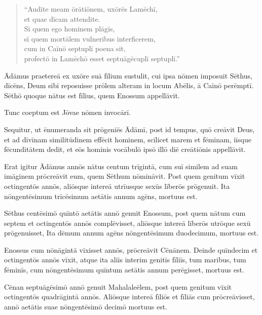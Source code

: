 \begin{verse}
\begin{patverse*}
``Audīte meam ōrātiōnem, uxōrēs Lamēchī,\\
et quae dīcam attendite.\\
Sī quem ego hominem plāgīs,\\
sī quem mortālem vulneribus interficerem,\\
\Versus cum in Caīnō septuplī poena sit,\\ profectō in Lamēchō esset septuāgēcuplī septuplī.''
\end{patverse*}
\end{verse}

\Versus Ādāmus praetereā ex uxōre suā fīlium sustulit, cui ipsa nōmen imposuit Sēthus, dīcēns, Deum sibi reposuisse prōlem alteram in locum Abēlis, ā Caīnō perēmptī.
\Versus Sēthō quoque nātus est fīlius, quem Enossum appellāvit.

Tunc coeptum est Jōvae nōmen invocārī.



\Caput
\Versus Sequitur, ut ēnumeranda sit prōgeniēs Ādāmī, post id tempus, quō creāvit Deus, et ad dīvīnam similitūdinem effēcit hominem,
\Versus scīlicet marem et fēminam, iīsque fēcunditātem dedit, et eōs hominis vocābulō ipsō illō diē creātiōnis appellāvit.

\Versus Erat igitur Ādāmus annōs nātus centum trīgintā, cum suī similem ad suam imāginem prōcreāvit eum, quem Sēthum nōmināvit.
\Versus Post quem genitum vīxit octingentōs annōs, aliōsque intereā utrīusque sexūs līberōs prōgenuit.
\Versus Ita nōngentēsimum trīcēsimum aetātis annum agēns, mortuus est.

\Versus Sēthus centēsimō quīntō aetātis annō genuit Enossum,
\Versus post quem nātum cum septem et octingentōs annōs complēvisset, aliōsque intereā līberōs utrōque sexū prōgenuisset,
\Versus Ita dēmum annum agēns nōngentēsimum duodecimum, mortuus est.

\Versus Enossus cum nōnāgintā vīxisset annōs, prōcreāvit Cēnānem.
\Versus Deinde quīndecim et octingentōs annōs vīxit, atque ita aliīs interim genitīs fīliīs, tum maribus, tum fēminīs,
\Versus cum nōngentēsimum quīntum aetātis annum perēgisset, mortuus est.

\Versus Cēnan septuāgēsimō annō genuit Mahalaleēlem,
\Versus post quem genitum vīxit octingentōs quadrāgintā annōs. Aliōsque intereā fīliōs et fīliās cum prōcreāvisset,
\Versus annō aetātis suae nōngentēsimō decimō mortuus est.


